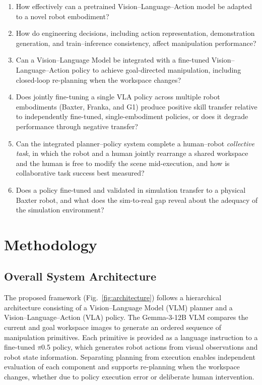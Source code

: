 \documentclass[12pt]{article}
\begin{document}
\begin{enumerate}
\item[\textbf{RQ1}] How effectively can a pretrained Vision--Language--Action model be adapted to a novel robot embodiment?
\item[\textbf{RQ2}] How do engineering decisions, including action representation, demonstration generation, and train--inference consistency, affect manipulation performance?
\item[\textbf{RQ3}] Can a Vision--Language Model be integrated with a fine-tuned Vision--Language--Action policy to achieve goal-directed manipulation, including closed-loop re-planning when the workspace changes?
\item[\textbf{RQ4}] Does jointly fine-tuning a single VLA policy across multiple robot embodiments (Baxter, Franka, and G1) produce positive skill transfer relative to independently fine-tuned, single-embodiment policies, or does it degrade performance through negative transfer?
\item[\textbf{RQ5}] Can the integrated planner--policy system complete a human--robot \emph{collective task}, in which the robot and a human jointly rearrange a shared workspace and the human is free to modify the scene mid-execution, and how is collaborative task success best measured?
\item[\textbf{RQ6}] Does a policy fine-tuned and validated in simulation transfer to a physical Baxter robot, and what does the sim-to-real gap reveal about the adequacy of the simulation environment?
\end{enumerate}

\section{Methodology}
\label{sec:methodology}

\subsection{Overall System Architecture}

The proposed framework (Fig.~\ref{fig:architecture}) follows a hierarchical architecture consisting of a Vision--Language Model (VLM) planner and a Vision--Language--Action (VLA) policy. The Gemma-3-12B VLM compares the current and goal workspace images to generate an ordered sequence of manipulation primitives. Each primitive is provided as a language instruction to a fine-tuned $\pi$0.5 policy, which generates robot actions from visual observations and robot state information. Separating planning from execution enables independent evaluation of each component and supports re-planning when the workspace changes, whether due to policy execution error or deliberate human intervention.
\end{document}
